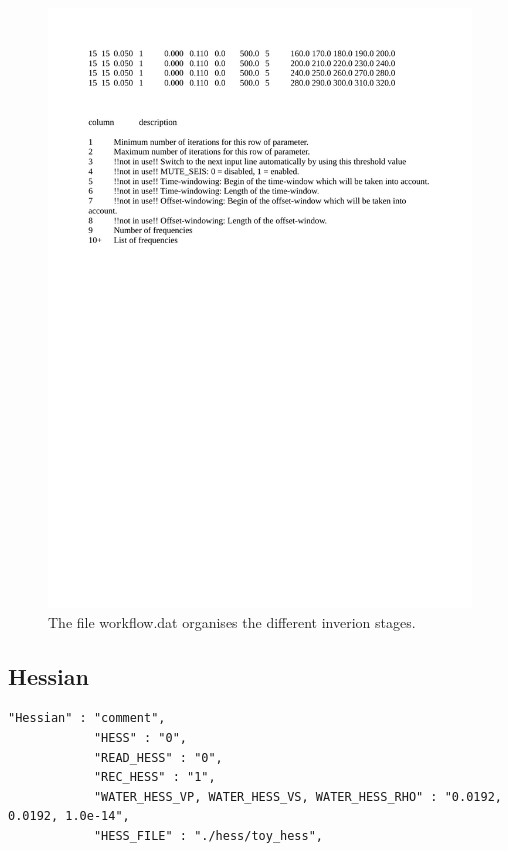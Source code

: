 \begin{figure}[h!]
\begin{center}
\includegraphics[width=\textwidth]{fig/workflow_input}
\caption[Workflow.dat]{The file workflow.dat organises the different inverion stages.}\label{fig:workflow_input}
\end{center}
\end{figure}
\subsection{Hessian}
\begin{verbatim}
"Hessian" : "comment",
			"HESS" : "0",
			"READ_HESS" : "0",
			"REC_HESS" : "1", 
			"WATER_HESS_VP, WATER_HESS_VS, WATER_HESS_RHO" : "0.0192, 0.0192, 1.0e-14",
			"HESS_FILE" : "./hess/toy_hess",
\end{verbatim}

